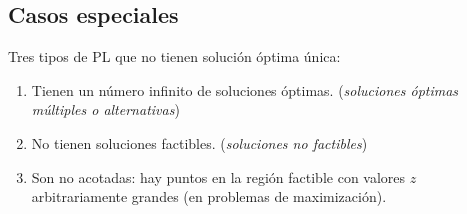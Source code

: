 \documentclass[../main.tex]{subfiles}
\begin{document}
    \subsection{Casos especiales}
        Tres tipos de PL que no tienen solución óptima única:
        \begin{enumerate}
            \item Tienen un número infinito de soluciones óptimas. (\textit{soluciones óptimas múltiples o alternativas})
            \item No tienen soluciones factibles. (\textit{soluciones no factibles})
            \item Son no acotadas: hay puntos en la región factible con valores $z$ arbitrariamente grandes (en problemas de maximización).
        \end{enumerate}

        \begin{example}
            
        \end{example}
\end{document}
